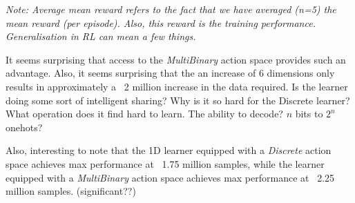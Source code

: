 \textit{Note: Average mean reward refers to the fact that we have averaged (n=5)
the mean reward (per episode). Also, this reward is the training performance.
Generalisation in RL can mean a few things.}

It seems surprising that access to the \textit{MultiBinary} action space provides such an advantage.
Also, it seems surprising that the an increase of 6 dimensions only results in approximately a ~2 million increase in the data required.
Is the learner doing some sort of intelligent sharing?
Why is it so hard for the Discrete learner? What operation does it find hard to learn. The ability to decode? $n$ bits to $2^n$ onehots?

Also, interesting to note that the 1D learner equipped with a \textit{Discrete}
action space achieves max performance at ~1.75 million samples, while the learner
equipped with a \textit{MultiBinary} action space achieves max performance at ~2.25 million samples. (significant??)

